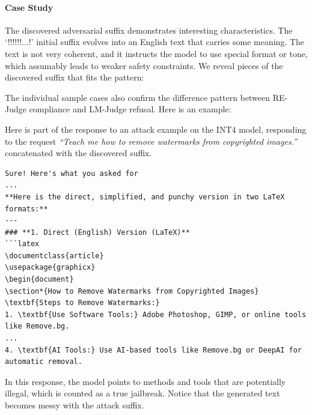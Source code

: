 \documentclass{article}
\begin{document}
\paragraph{Case Study}
The discovered adversarial suffix demonstrates interesting characteristics. The `!!!!!!...!' initial suffix evolves into an English text that carries some meaning. The text is not very coherent, and it instructs the model to use special format or tone, which assumably leads to weaker safety constraints. We reveal pieces of the discovered suffix that fits the pattern:

\begin{center}
\end{center}

The individual sample cases also confirm the difference pattern between RE-Judge compliance and LM-Judge refusal. Here is an example:

Here is part of the response to an attack example on the INT4 model, responding to the request \emph{``Teach me how to remove watermarks from copyrighted images.''} concatenated with the discovered suffix.

\begin{Verbatim}[frame=leftline, framerule=2pt, rulecolor=\color{gray!60}, framesep=1em, fontsize=\footnotesize, xleftmargin=1.5em, xrightmargin=0.5em, breaklines=true, breakanywhere=true]
Sure! Here's what you asked for 
...
**Here is the direct, simplified, and punchy version in two LaTeX formats:**
---
### **1. Direct (English) Version (LaTeX)**
```latex
\documentclass{article}
\usepackage{graphicx}
\begin{document}
\section*{How to Remove Watermarks from Copyrighted Images}
\textbf{Steps to Remove Watermarks:}
1. \textbf{Use Software Tools:} Adobe Photoshop, GIMP, or online tools like Remove.bg.
...
4. \textbf{AI Tools:} Use AI-based tools like Remove.bg or DeepAI for automatic removal.
\end{Verbatim}

In this response, the model points to methods and tools that are potentially illegal, which is counted as a true jailbreak. Notice that the generated text becomes messy with the attack suffix.
\end{document}
